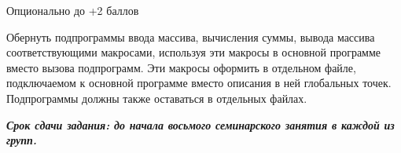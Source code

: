 Опционально до +2 баллов

Обернуть подпрограммы ввода массива, вычисления суммы, вывода массива соответствующими макросами, используя эти макросы в основной программе вместо вызова подпрограмм. Эти макросы оформить в отдельном файле, подключаемом к основной программе вместо описания в ней глобальных точек. Подпрограммы должны также оставаться в отдельных файлах.

\textbf{\textit{Срок сдачи задания: до начала восьмого семинарского занятия в каждой из групп.}}


